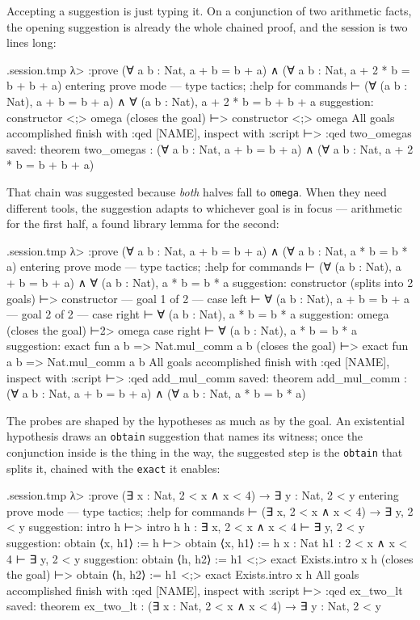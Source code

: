 \documentclass[11pt,oneside]{article}
\newcommand{\code}[1]{\texttt{#1}}
\newenvironment{session}
 {\VerbatimEnvironment\begin{VerbatimOut}{\jobname.session.tmp}}
 {\end{VerbatimOut}%
  \begin{sessionouter}%
  \VerbatimInput[fontsize=\footnotesize, breaklines=true,
    breaksymbolleft={\textcolor{stone}{\footnotesize$\hookrightarrow$}},
    formatcom=\color{ink}, tabsize=4]{\jobname.session.tmp}%
  \end{sessionouter}}
\begin{document}
Accepting a suggestion is just typing it.  On a conjunction of two
arithmetic facts, the opening suggestion is already the whole chained
proof, and the session is two lines long:

\begin{session}
λ> :prove (∀ a b : Nat, a + b = b + a) ∧ (∀ a b : Nat, a + 2 * b = b + b + a)
entering prove mode — type tactics; :help for commands
⊢ (∀ (a b : Nat), a + b = b + a) ∧ ∀ (a b : Nat), a + 2 * b = b + b + a
suggestion: constructor <;> omega  (closes the goal)
⊢> constructor <;> omega
All goals accomplished
finish with :qed [NAME], inspect with :script
⊢> :qed two_omegas
saved: theorem two_omegas : (∀ a b : Nat, a + b = b + a) ∧ (∀ a b : Nat, a + 2 * b = b + b + a)
\end{session}

That chain was suggested because \emph{both} halves fall to
\code{omega}.  When they need different tools, the suggestion adapts
to whichever goal is in focus --- arithmetic for the first half, a
found library lemma for the second:

\begin{session}
λ> :prove (∀ a b : Nat, a + b = b + a) ∧ (∀ a b : Nat, a * b = b * a)
entering prove mode — type tactics; :help for commands
⊢ (∀ (a b : Nat), a + b = b + a) ∧ ∀ (a b : Nat), a * b = b * a
suggestion: constructor  (splits into 2 goals)
⊢> constructor
— goal 1 of 2 —
case left
⊢ ∀ (a b : Nat), a + b = b + a
— goal 2 of 2 —
case right
⊢ ∀ (a b : Nat), a * b = b * a
suggestion: omega  (closes the goal)
⊢2> omega
case right
⊢ ∀ (a b : Nat), a * b = b * a
suggestion: exact fun a b => Nat.mul_comm a b  (closes the goal)
⊢> exact fun a b => Nat.mul_comm a b
All goals accomplished
finish with :qed [NAME], inspect with :script
⊢> :qed add_mul_comm
saved: theorem add_mul_comm : (∀ a b : Nat, a + b = b + a) ∧ (∀ a b : Nat, a * b = b * a)
\end{session}

The probes are shaped by the hypotheses as much as by the goal.  An
existential hypothesis draws an \code{obtain} suggestion that names
its witness; once the conjunction inside is the thing in the way, the
suggested step is the \code{obtain} that splits it, chained with the
\code{exact} it enables:

\begin{session}
λ> :prove (∃ x : Nat, 2 < x ∧ x < 4) → ∃ y : Nat, 2 < y
entering prove mode — type tactics; :help for commands
⊢ (∃ x, 2 < x ∧ x < 4) → ∃ y, 2 < y
suggestion: intro h
⊢> intro h
h : ∃ x, 2 < x ∧ x < 4
⊢ ∃ y, 2 < y
suggestion: obtain ⟨x, h1⟩ := h
⊢> obtain ⟨x, h1⟩ := h
x : Nat
h1 : 2 < x ∧ x < 4
⊢ ∃ y, 2 < y
suggestion: obtain ⟨h, h2⟩ := h1 <;> exact Exists.intro x h  (closes the goal)
⊢> obtain ⟨h, h2⟩ := h1 <;> exact Exists.intro x h
All goals accomplished
finish with :qed [NAME], inspect with :script
⊢> :qed ex_two_lt
saved: theorem ex_two_lt : (∃ x : Nat, 2 < x ∧ x < 4) → ∃ y : Nat, 2 < y
\end{session}
\end{document}
